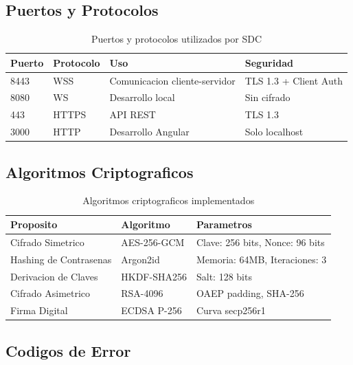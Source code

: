 \subsection{Puertos y Protocolos}

\begin{table}[H]
\centering
\begin{tabular}{p{2cm}p{3cm}p{4cm}p{4cm}}
\toprule
\textbf{Puerto} & \textbf{Protocolo} & \textbf{Uso} & \textbf{Seguridad} \\
\midrule
8443 & WSS & Comunicacion cliente-servidor & TLS 1.3 + Client Auth \\
\midrule
8080 & WS & Desarrollo local & Sin cifrado \\
\midrule
443 & HTTPS & API REST & TLS 1.3 \\
\midrule
3000 & HTTP & Desarrollo Angular & Solo localhost \\
\bottomrule
\end{tabular}
\caption{Puertos y protocolos utilizados por SDC}
\label{tab:puertos}
\end{table}

\subsection{Algoritmos Criptograficos}

\begin{table}[H]
\centering
\begin{tabular}{p{4cm}p{4cm}p{5cm}}
\toprule
\textbf{Proposito} & \textbf{Algoritmo} & \textbf{Parametros} \\
\midrule
Cifrado Simetrico & AES-256-GCM & Clave: 256 bits, Nonce: 96 bits \\
\midrule
Hashing de Contrasenas & Argon2id & Memoria: 64MB, Iteraciones: 3 \\
\midrule
Derivacion de Claves & HKDF-SHA256 & Salt: 128 bits \\
\midrule
Cifrado Asimetrico & RSA-4096 & OAEP padding, SHA-256 \\
\midrule
Firma Digital & ECDSA P-256 & Curva secp256r1 \\
\bottomrule
\end{tabular}
\caption{Algoritmos criptograficos implementados}
\label{tab:crypto}
\end{table}

\subsection{Codigos de Error}

